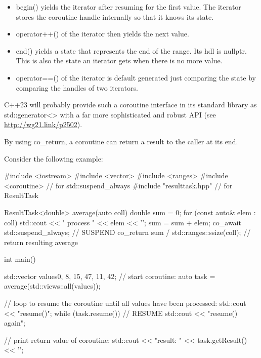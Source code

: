 \begin{itemize}
\item 
begin() yields the iterator after resuming for the first value. The iterator stores the coroutine handle internally so that it knows its state.

\item 
operator++() of the iterator then yields the next value.

\item 
end() yields a state that represents the end of the range. Its hdl is nullptr. This is also the state an iterator gets when there is no more value.

\item 
operator==() of the iterator is default generated just comparing the state by comparing the handles of two iterators.
\end{itemize}

C++23 will probably provide such a coroutine interface in its standard library as std::generator<> with a far more sophisticated and robust API (see \url{http://wg21.link/p2502}).


By using co\_return, a coroutine can return a result to the caller at its end.

Consider the following example:


\begin{cpp}
#include <iostream>
#include <vector>
#include <ranges>
#include <coroutine> // for std::suspend_always{}
#include "resulttask.hpp" // for ResultTask

ResultTask<double> average(auto coll)
{
	double sum = 0;
	for (const auto& elem : coll) {
		std::cout << " process " << elem << '\n';
		sum = sum + elem;
		co_await std::suspend_always{}; // SUSPEND
	}
	co_return sum / std::ranges::ssize(coll); // return resulting average
}

int main()
{
	std::vector values{0, 8, 15, 47, 11, 42};
	// start coroutine:
	auto task = average(std::views::all(values));
	
	// loop to resume the coroutine until all values have been processed:
	std::cout << "resume()\n";
	while (task.resume()) { // RESUME
		std::cout << "resume() again\n";
	}
	
	// print return value of coroutine:
	std::cout << "result: " << task.getResult() << '\n';
}
\end{cpp}

